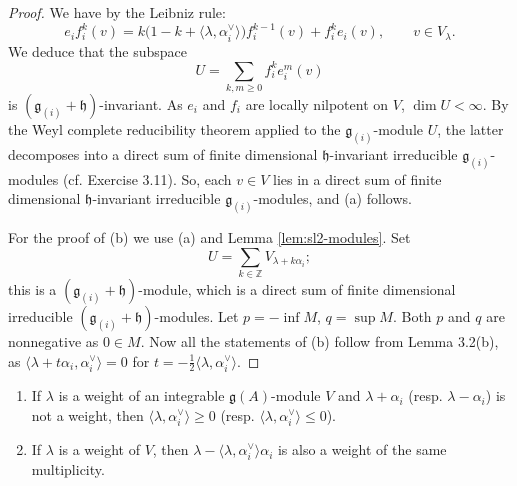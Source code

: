 \documentclass[12pt]{article}
\begin{document}
\begin{proof}
    We have by the Leibniz rule:
    \begin{equation}\label{eq:361}
        e_i f_i^k(v) = k\bigl(1-k+\langle \lambda,\alpha_i^\vee\rangle\bigr) f_i^{k-1}(v)
        + f_i^k e_i(v), \qquad v\in V_\lambda.
    \end{equation}
    We deduce that the subspace
    \[
        U=\sum_{k,m\ge0} f_i^k e_i^m(v)
    \]
    is $(\mathfrak{g}_{(i)}+\mathfrak{h})$-invariant. As $e_i$ and $f_i$ are locally nilpotent on $V$, $\dim U < \infty$.
    By the Weyl complete reducibility theorem applied to the $\mathfrak{g}_{(i)}$-module $U$, the latter decomposes into a direct sum of finite dimensional
    $\mathfrak{h}$-invariant irreducible $\mathfrak{g}_{(i)}$-modules (cf. Exercise 3.11). So, each $v\in V$ lies in a direct sum of finite dimensional
    $\mathfrak{h}$-invariant irreducible $\mathfrak{g}_{(i)}$-modules, and (a) follows.

    For the proof of (b) we use (a) and Lemma \ref{lem:sl2-modules}. Set
    \[
        U=\sum_{k\in\mathbb{Z}} V_{\lambda+k\alpha_i};
    \]
    this is a $(\mathfrak{g}_{(i)}+\mathfrak{h})$-module, which is a direct sum of finite dimensional irreducible $(\mathfrak{g}_{(i)}+\mathfrak{h})$-modules.
    Let $p=-\inf M$, $q=\sup M$. Both $p$ and $q$ are nonnegative as $0\in M$. Now all the statements of (b) follow from Lemma 3.2(b), as
    $\langle \lambda+t\alpha_i,\alpha_i^\vee\rangle=0$ for $t=-\tfrac{1}{2}\langle\lambda,\alpha_i^\vee\rangle$.
\end{proof}

\begin{corollary}\label{cor:weights-integrable}
    \leavevmode
    \begin{enumerate}[label=(\alph*)]
        \item If $\lambda$ is a weight of an integrable $\mathfrak{g}(A)$-module $V$ and $\lambda+\alpha_i$
              (resp. $\lambda-\alpha_i$) is not a weight, then $\langle \lambda,\alpha_i^\vee\rangle \ge 0$
              (resp. $\langle \lambda,\alpha_i^\vee\rangle \le 0$).

        \item If $\lambda$ is a weight of $V$, then $\lambda - \langle \lambda,\alpha_i^\vee\rangle \alpha_i$
              is also a weight of the same multiplicity.
    \end{enumerate}
\end{corollary}
\end{document}
